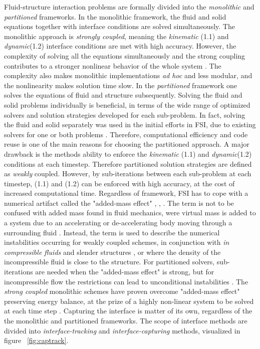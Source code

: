 Fluid-structure interaction problems are formally divided into the \textit{monolithic} and \textit{partitioned} frameworks. In the monolithic framework, the fluid and solid equations together with interface conditions are solved simultaneously. The monolithic approach is \textit{strongly coupled}, meaning the \textit{kinematic} (1.1) and \textit{dynamic}(1.2) interface conditions are met with high accuracy. However, the complexity of solving all the equations simultaneously and the strong coupling contributes to a stronger nonlinear behavior of the whole system \cite{Wick}. The complexity also makes monolithic implementations \textit{ad hoc} and less modular, and the nonlinearity makes solution time slow. In the \textit{partitioned} framework one solves the equations of fluid and structure subsequently. Solving the fluid and solid problems individually is beneficial, in terms of the wide range of optimized solvers and solution strategies developed for each sub-problem. In fact, solving the fluid and solid separately was used in the initial efforts in FSI, due to existing solvers for one or both problems \cite{Gatzhammer2014}. Therefore, computational efficiency and code reuse is one of the main reasons for choosing the partitioned approach. A major drawback is the methods ability to enforce the \textit{kinematic} (1.1) and \textit{dynamic}(1.2) conditions at each timestep. Therefore partitioned solution strategies are defined as \textit{weakly} coupled. However, by sub-iterations between each sub-problem at each timestep, (1.1) and (1.2) can be enforced with high accuracy, at the cost of increased computational time. Regardless of framework, FSI has to cope with a numerical artifact called the "added-mass effect" \cite{Fernandez2007}, \cite{Fernandez2009}, \cite{Forster2007}. The term is not to be confused with added mass found in fluid mechanics, were virtual mass is added to a system due to an accelerating or de-accelerating body moving through a surrounding fluid \cite{Newman1977}. Instead, the term is used to describe the numerical instabilities occurring for weakly coupled schemes, in conjunction with \textit{in compressible fluids} and slender structures \cite{Forster2007}, or where the density of the incompressible fluid is close to the structure. For partitioned solvers, sub-iterations are needed when the "added-mass effect" is strong, but for incompressible flow the restrictions can lead to unconditional instabilities \cite{Gatzhammer2014}. The \textit{strong coupled} monolithic schemes have proven overcome "added-mass effect" preserving energy balance, at the prize of a highly non-linear system to be solved at each time step \cite{Fernandez2007}.
Capturing the interface is matter of its own, regardless of the the monolithic and partitioned frameworks.
The scope of interface methods are divided into \textit{interface-tracking} and \textit{interface-capturing } methods, visualized in figure ~\ref{fig:captrack}. 

